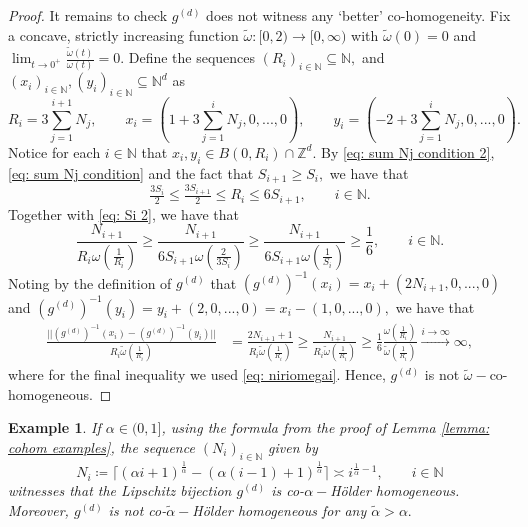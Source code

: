 \documentclass{article}
\newtheorem{example}[define]{Example}
\newcommand{\Z}{\mathbb{Z}}
\newcommand{\N}{\mathbb{N}}
\begin{document}
\begin{proof}
    It remains to check $g^{(d)}$ does not witness any `better' co-homogeneity. Fix a concave, strictly increasing function $\widetilde{\omega}:[0,2) \to [0,\infty)$ with $\widetilde{\omega}(0) = 0$ and $\lim_{t \to 0^+} \frac{\widetilde{\omega}(t)}{\omega(t)} = 0$. 
    Define the sequences $(R_i)_{i \in \N}\subseteq \N,$ and $(x_i)_{i \in \N},(y_i)_{i \in \N} \subseteq \N^d$ as
    $$R_i = 3\sum_{j=1}^{i+1}N_j, \qquad x_i = \left(1+3\sum_{j=1}^{i}N_j,0,...,0\right),\qquad y_i =\left(-2+3\sum_{j=1}^{i}N_j,0,...,0\right) .$$
  Notice for each $i \in \N$ that $x_i,y_i \in B(0,R_i) \cap \Z^d.$ 
  By \eqref{eq: sum Nj condition 2}, \eqref{eq: sum Nj condition} and the fact that $S_{i+1} \geq S_i,$ we have that $$\tfrac{3S_{i}}{2} \leq \tfrac{3S_{i+1}}{2} \leq R_i \leq 6S_{i+1}, \qquad i \in \N.$$ Together with \eqref{eq: Si 2}, we have that
  \begin{equation} \label{eq: niriomegai}
\frac{N_{i+1}}{R_i\omega\left(\frac{1}{R_i}\right)} \geq \frac{N_{i+1}}{6S_{i+1}\omega\left(\frac{2}{3S_{i}}\right)}\geq \frac{N_{i+1}}{6S_{i+1}\omega\left(\frac{1}{S_{i}}\right)}\geq \frac{1}{6}, \qquad i \in \N. \end{equation}
 Noting by the definition of $g^{(d)}$ that $(g^{(d)})^{-1}(x_i) = x_i+(2N_{i+1},0,...,0)$ and $(g^{(d)})^{-1}(y_i) = y_i + (2,0,...,0) = x_i-(1,0,...,0),$ we have that
  \begin{equation*}
      \begin{split}
          \frac{||(g^{(d)})^{-1}(x_i) - (g^{(d)})^{-1}(y_i)||}{R_i \widetilde{\omega}\left(\frac{1}{R_i}\right)}  &= \frac{2N_{i+1}+1}{R_i \widetilde{\omega}\left(\frac{1}{R_i}\right)} \geq \frac{N_{i+1}}{R_i \widetilde{\omega}\left(\frac{1}{R_i}\right)}
          \geq \frac{1}{6}\frac{{\omega}\left(\frac{1}{R_i}\right)}{\widetilde{\omega}\left(\frac{1}{R_i}\right)}\xrightarrow{i \to \infty}\infty,
      \end{split}
  \end{equation*} where for the final inequality we used \eqref{eq: niriomegai}. Hence, $g^{(d)}$ is not $\widetilde{\omega}-$co-homogeneous.
\end{proof}
    \begin{example}
        If $\alpha \in (0,1]$, using the formula from the proof of Lemma \ref{lemma: cohom examples}, the sequence $(N_i)_{i \in \N}$ given by $$N_i\coloneqq \lceil(\alpha i+1)^{\frac{1}{\alpha}}-(\alpha (i-1)+1)^{\frac{1}{\alpha}} \rceil \asymp i^{\frac{1}{\alpha}-1}, \qquad i \in \N$$ witnesses that the Lipschitz bijection $g^{(d)}$ is co-$\alpha-$H\"{o}lder homogeneous. Moreover, $g^{(d)}$ is not co-$\tilde{\alpha}-$H\"{o}lder homogeneous for any $\tilde{\alpha} >\alpha.$
    \end{example}
\end{document}
